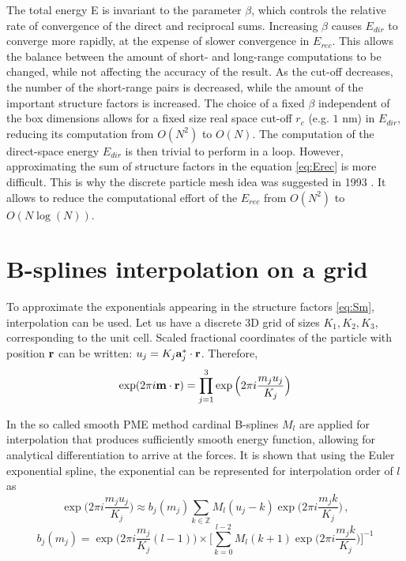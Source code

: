 \documentclass[12pt,a4paper,notitlepage]{report}
\newcommand{\draft}[1]{#1}
\begin{document}
The total energy E is invariant to the parameter $\beta$, which
controls the relative rate of convergence of the direct and
reciprocal sums. Increasing $\beta$ causes $E_{dir}$ to converge more
rapidly, at the expense of slower convergence in $E_{rec}$.
This allows the balance between the amount of short- and long-range computations to be changed, while not affecting the accuracy of the result. As the cut-off decreases, the number of the short-range pairs is decreased, while the amount of the important structure factors is increased.
The choice of a fixed $\beta$ independent of the box
dimensions allows for a fixed size real space cut-off $r_c$ (e.g. $1$ nm) in $E_{dir}$, reducing its computation from $O(N^2)$ to $O(N)$.
The computation of the direct-space energy $E_{dir}$ is then trivial to perform in a loop. However, approximating the sum of structure factors in the equation \eqref{eq:Erec} is more difficult. This is why the discrete particle mesh idea was suggested in 1993 \cite{pme}. It allows to reduce the computational effort of the $E_{rec}$ from $O(N^2)$ to $O(N \log (N))$.


\section{B-splines interpolation on a grid}
To approximate the exponentials appearing in the structure factors \eqref{eq:Sm}, interpolation can be used. Let us have a discrete 3D grid of sizes $K_1, K_2, K_3$, corresponding to the unit cell. Scaled fractional coordinates of the particle with position $\bold{r}$ can be written: $u_j = K_j \bold{a}_j^*\cdot  \bold{r}$. 
Therefore, 
\[\exp(2\pi i\bold{m}\cdot\bold{r}) = \prod\limits_{j=1}^3\exp\Big(2\pi i\frac{m_j u_j}{K_j}\Big)\]



In the so called smooth PME method \cite{spme} cardinal B-splines $M_l$ are applied for interpolation that produces sufficiently smooth energy function, allowing for analytical differentiation to arrive at the forces.
It is shown that using the Euler exponential spline, the exponential can be represented for interpolation order of $l$ as
\[\exp\Big(2\pi i\frac{m_j u_j}{K_j}\Big) \approx b_j(m_j) \sum\limits_{k\in \mathbb{Z}}M_l(u_j - k)\exp\Big(2\pi i\frac{m_j k}{K_j}\Big)\,,\]
\begin{equation}\label{BSpline}
b_j(m_j) = \exp\Big(2\pi i\frac{m_j}{K_j}(l-1)\Big) \times \Big[\sum\limits_{k=0}^{l-2}M_l(k + 1)\exp\Big(2\pi i\frac{m_j k}{K_j}\Big) \Big]^{-1}
\end{equation}
\end{document}
